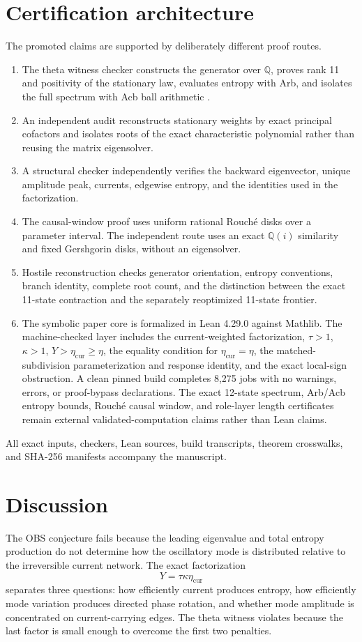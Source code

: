 \documentclass[aps,pre,reprint,groupedaddress,nofootinbib,showkeys,floatfix]{revtex4-2}
\newcommand{\ecur}{\eta_{\mathrm{cur}}}
\begin{document}
\section{Certification architecture}
The promoted claims are supported by deliberately different proof routes.
\begin{enumerate}
\item The theta witness checker constructs the generator over $\mathbb Q$, proves rank 11 and positivity of the stationary law, evaluates entropy with Arb, and isolates the full spectrum with Acb ball arithmetic \cite{Johansson2017}.
\item An independent audit reconstructs stationary weights by exact principal cofactors and isolates roots of the exact characteristic polynomial rather than reusing the matrix eigensolver.
\item A structural checker independently verifies the backward eigenvector, unique amplitude peak, currents, edgewise entropy, and the identities used in the factorization.
\item The causal-window proof uses uniform rational Rouch\'e disks over a parameter interval. The independent route uses an exact $\mathbb Q(i)$ similarity and fixed Gershgorin disks, without an eigensolver.
\item Hostile reconstruction checks generator orientation, entropy conventions, branch identity, complete root count, and the distinction between the exact 11-state contraction and the separately reoptimized 11-state frontier.
\item The symbolic paper core is formalized in Lean 4.29.0 against Mathlib. The machine-checked layer includes the current-weighted factorization, $\tau>1$, $\kappa>1$, $Y>\ecur\ge\eta$, the equality condition for $\ecur=\eta$, the matched-subdivision parameterization and response identity, and the exact local-sign obstruction. A clean pinned build completes 8,275 jobs with no warnings, errors, or proof-bypass declarations. The exact 12-state spectrum, Arb/Acb entropy bounds, Rouch\'e causal window, and role-layer length certificates remain external validated-computation claims rather than Lean claims.
\end{enumerate}
All exact inputs, checkers, Lean sources, build transcripts, theorem crosswalks, and SHA-256 manifests accompany the manuscript.

\section{Discussion}
The OBS conjecture fails because the leading eigenvalue and total entropy production do not determine how the oscillatory mode is distributed relative to the irreversible current network. The exact factorization
\begin{equation}
Y=\tau\kappa\ecur
\end{equation}
separates three questions: how efficiently current produces entropy, how efficiently mode variation produces directed phase rotation, and whether mode amplitude is concentrated on current-carrying edges. The theta witness violates because the last factor is small enough to overcome the first two penalties.
\end{document}
